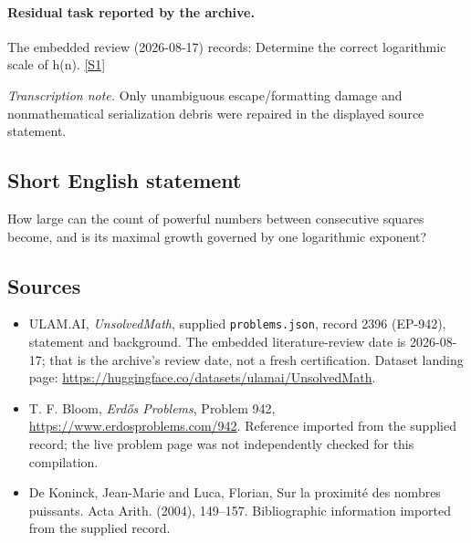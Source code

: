 \documentclass[11pt,a4paper]{article}
\newcommand{\sref}[2]{\hyperlink{source:#1:#2}{[S#2]}}
\begin{document}
\paragraph{Residual task reported by the archive.}

The embedded review (2026-08-17) records: Determine the correct logarithmic scale of h(n). \sref{2396}{1}

{\small\emph{Transcription note.} Only unambiguous escape/formatting damage and nonmathematical serialization debris were repaired in the displayed source statement.}

\subsection{Short English statement}

How large can the count of powerful numbers between consecutive squares become, and is its maximal growth governed by one logarithmic exponent?

\subsection{Sources}

{\small

\begin{itemize}

\item[\hypertarget{source:2396:1}{S1}] ULAM.AI, \emph{UnsolvedMath}, supplied \texttt{problems.json}, record 2396 (EP-942), statement and background. The embedded literature-review date is 2026-08-17; that is the archive’s review date, not a fresh certification. Dataset landing page: \url{https://huggingface.co/datasets/ulamai/UnsolvedMath}.

\item[\hypertarget{source:2396:2}{S2}] T. F. Bloom, \emph{Erdős Problems}, Problem 942, \url{https://www.erdosproblems.com/942}. Reference imported from the supplied record; the live problem page was not independently checked for this compilation.

\item[\hypertarget{source:2396:3}{S3}] De Koninck, Jean-Marie and Luca, Florian, Sur la proximit\'{e} des nombres puissants. Acta Arith. (2004), 149--157. Bibliographic information imported from the supplied record.

\end{itemize}

}

\label{end:2396}
\end{document}
